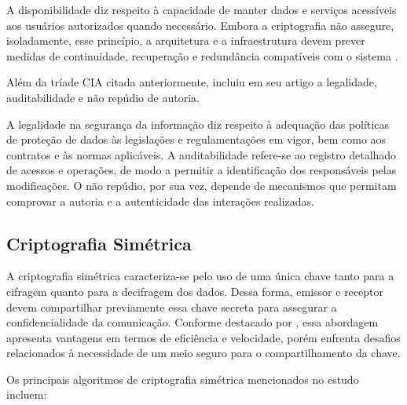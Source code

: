 A disponibilidade diz respeito à capacidade de manter dados e serviços acessíveis aos usuários autorizados quando necessário. Embora a criptografia não assegure, isoladamente, esse princípio, a arquitetura e a infraestrutura devem prever medidas de continuidade, recuperação e redundância compatíveis com o sistema \cite{viana2022criptografia}.

Além da tríade CIA citada anteriormente,  incluiu em seu artigo a legalidade, auditabilidade e não repúdio de autoria.

A legalidade na segurança da informação diz respeito à adequação das políticas de proteção de dados às legislações e regulamentações em vigor, bem como aos contratos e às normas aplicáveis. A auditabilidade refere-se ao registro detalhado de acessos e operações, de modo a permitir a identificação dos responsáveis pelas modificações. O não repúdio, por sua vez, depende de mecanismos que permitam comprovar a autoria e a autenticidade das interações realizadas.

\subsection{Criptografia Simétrica}

A criptografia simétrica caracteriza-se pelo uso de uma única chave tanto para a cifragem quanto para a decifragem dos dados. Dessa forma, emissor e receptor devem compartilhar previamente essa chave secreta para assegurar a confidencialidade da comunicação. Conforme destacado por , essa abordagem apresenta vantagens em termos de eficiência e velocidade, porém enfrenta desafios relacionados à necessidade de um meio seguro para o compartilhamento da chave.

Os principais algoritmos de criptografia simétrica mencionados no estudo incluem:

